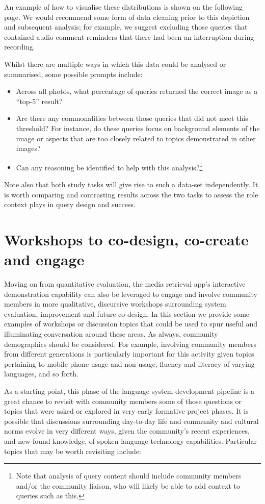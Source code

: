 \documentclass[10pt,twoside,openright]{report}
\begin{document}
An example of how to visualise these distributions is shown on the following page.
We would recommend some form of data cleaning prior to this depiction and subsequent analysis; for example, we suggest excluding those queries that contained audio comment reminders that there had been an interruption during recording.

Whilst there are multiple ways in which this data could be analysed or summarised, some possible prompts include: 
\begin{itemize}
    \item Across all photos, what percentage of queries returned the correct image as a ``top-5'' result?
    \item Are there any commonalities between those queries that did not meet this threshold?
    For instance, do these queries focus on background elements of the image or aspects that are too closely related to topics demonstrated in other images?    
    \item Can any reasoning be identified to help with this analysis?\footnote{Note that analysis of query content should include community members and/or the community liaison, who will likely be able to add context to queries such as this.
}
\end{itemize}

Note also that both study tasks will give rise to such a data-set independently.
It is worth comparing and contrasting results across the two tasks to assess the role context plays in query design and success.


\section{Workshops to co-design, co-create and engage}
Moving on from quantitative evaluation, the media retrieval app's interactive demonstration capability can also be leveraged to engage and involve community members in more qualitative, discursive workshops surrounding system evaluation, improvement and future co-design.
In this section we provide some examples of workshops or discussion topics that could be used to spur useful and illuminating conversation around these areas.
As always, community demographics should be considered.
For example, involving community members from different generations is particularly important for this activity given topics pertaining to mobile phone usage and non-usage, fluency and literacy of varying languages, and so forth.

As a starting point, this phase of the language system development pipeline is a great chance to revisit with community members some of those questions or topics that were asked or explored in very early formative project phases.
It is possible that discussions surrounding day-to-day life and community and cultural norms evolve in very different ways, given the community's recent experiences, and new-found knowledge, of spoken language technology capabilities.
Particular topics that may be worth revisiting include:
\end{document}
